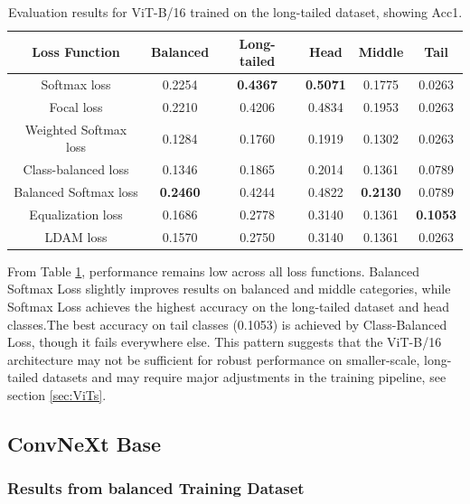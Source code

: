 \begin{table}[h!]
    \centering
    \caption{Evaluation results for ViT-B/16 trained on the long-tailed dataset, showing Acc1.}
    \begin{tabular}{cccccc}
        \toprule
        Loss Function & Balanced & Long-tailed & Head & Middle & Tail \\ 
        \midrule
        Softmax loss   & 0.2254 & \textbf{0.4367} & \textbf{0.5071} & 0.1775 & 0.0263 \\
        Focal loss   & 0.2210 & 0.4206 & 0.4834 & 0.1953 & 0.0263 \\
        Weighted Softmax loss   & 0.1284 & 0.1760 & 0.1919 & 0.1302 & 0.0263 \\
        Class-balanced loss   & 0.1346 & 0.1865 & 0.2014 & 0.1361 & 0.0789 \\
        Balanced Softmax loss   & \textbf{0.2460} & 0.4244 & 0.4822 &  \textbf{0.2130} & 0.0789 \\
        Equalization loss   & 0.1686 & 0.2778 & 0.3140 & 0.1361 & \textbf{0.1053} \\
        LDAM loss   & 0.1570 & 0.2750 & 0.3140 & 0.1361 & 0.0263 \\
        \bottomrule
    \end{tabular}
    \label{tab:vit_lt_acc1}
\end{table}

From Table \ref{tab:vit_lt_acc1}, performance remains low across all loss functions. Balanced Softmax Loss slightly improves results on balanced and middle categories, while Softmax Loss achieves the highest accuracy on the long-tailed dataset and head classes.The best accuracy on tail classes (0.1053) is achieved by Class-Balanced Loss, though it fails everywhere else. This pattern suggests that the ViT-B/16 architecture may not be sufficient for robust performance on smaller-scale, long-tailed datasets and may require major adjustments in the training pipeline, see section \ref{sec:ViTs}. 

\subsection{ConvNeXt Base}

\subsubsection{Results from balanced Training Dataset}

